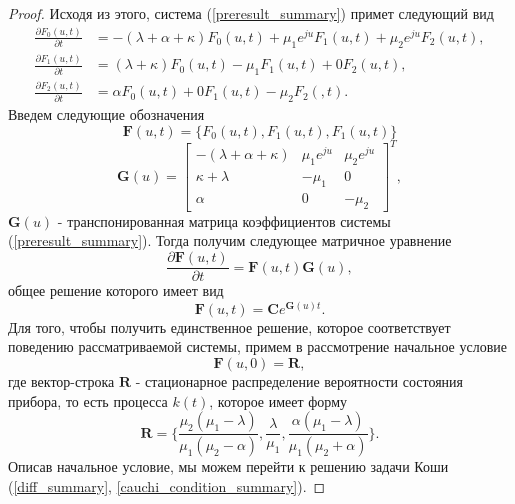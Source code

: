\begin{proof}
	Исходя из этого, система (\ref{preresult_summary}) примет следующий вид
	\begin{equation} \label{result_summary}
		\begin{split}
			\frac{{\partial F_{0}(u,t)}}{{\partial t}} &= -(\lambda + \alpha+ \kappa)F_{0}(u,t) + \mu_{1} e^{ju}F_{1}(u,t) + \mu_{2}e^{ju}F_{2}(u,t) ,
			\\
			\frac{{\partial F_{1}(u,t)}}{{\partial t}} &= (\lambda + \kappa)F_{0}(u,t) -  
			\mu_{1}F_{1}(u,t) +  0F_{2}(u,t) ,
			\\
			\frac{{\partial F_{2}(u,t)}}{{\partial t}} &= \alpha F_{0}(u,t)   +  0F_{1}(u,t) - \mu_{2}F_{2}(,t).
		\end{split}
	\end{equation}  
	Введем следующие обозначения
	\begin{equation*}
		\boldsymbol{F}(u,t) = \{F_{0}(u,t),F_{1}(u,t),F_{1}(u,t)\}
	\end{equation*}  
	\begin{equation*}
		\boldsymbol{G}(u)=\begin{bmatrix}
			-(\lambda + \alpha + \kappa) & \mu_{1}e^{ju} &  \mu_{2}e^{ju}\\
			\kappa+\lambda & -\mu_{1} & 0\\
			\alpha & 	0 &	-\mu_{2}
		\end{bmatrix}^{T},
	\end{equation*}
	$\boldsymbol{G}(u)$ - транспонированная матрица коэффициентов системы (\ref{preresult_summary}).
	Тогда получим следующее матричное уравнение
	\begin{equation*}
		\frac{{\partial \boldsymbol{F}(u,t)}}{{\partial t}} =\boldsymbol{F}(u,t)\boldsymbol{G}(u),
	\end{equation*}
	общее решение которого имеет вид
	\begin{equation} \label{diff_summary}
		\boldsymbol{F}(u,t)=\boldsymbol{C}e^{\boldsymbol{G}(u)t}.
	\end{equation}
	Для того, чтобы получить единственное решение, которое соответствует поведению рассматриваемой системы, примем в рассмотрение начальное условие
	\begin{equation} \label{cauchi_condition_summary}
		\boldsymbol{F}(u,0)=\boldsymbol{R},
	\end{equation}
	где вектор-строка $\boldsymbol{R}$ - стационарное распределение вероятности состояния прибора, то есть процесса $k(t)$, которое имеет форму \cite{nazarov2017asymptotic}
	\begin{equation*}
		\boldsymbol{R}=\{\frac{\mu_{2}(\mu_{1} - \lambda)}{\mu_{1}(\mu_{2} - \alpha)},\frac{\lambda}{\mu_{1}},\frac{\alpha(\mu_{1} - \lambda)}{\mu_{1}(\mu_{2} + \alpha)}\}.
	\end{equation*}
	Описав начальное условие, мы можем перейти к решению задачи Коши (\ref{diff_summary}, \ref{cauchi_condition_summary}).
	

\end{proof}
